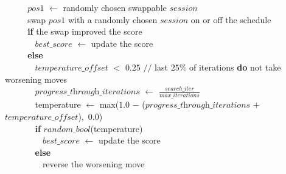 $~~~~~~~~~~~~$$\textit{pos1}$ $\leftarrow$ randomly chosen swappable $\textit{session}$\\
$~~~~~~~~~~~~$swap $\textit{pos1}$ with a randomly chosen $\textit{session}$ on or off the schedule\\
$~~~~~~~~~~~~${\bf if} the swap improved the score\\
$~~~~~~~~~~~~~~~~$$\textit{best\_score}$ $\leftarrow$ update the score\\
$~~~~~~~~~~~~${\bf else}\\
$~~~~~~~~~~~~~~~~$$\textit{temperature\_offset}$ $<$ $0.25$ $//$ last $25\%$ of iterations {\bf do} not take worsening moves\\
$~~~~~~~~~~~~~~~~$$\textit{progress\_through\_iterations}$ $\leftarrow$ $\frac{search\_iter}{max\_iterations}$\\
$~~~~~~~~~~~~~~~~$temperature $\leftarrow$ max($1.0$ $-$ ($\textit{progress\_through\_iterations}$ $+$ $\textit{temperature\_offset}$)$,$ $0.0$)\\
$~~~~~~~~~~~~~~~~${\bf if} $\textit{random\_bool}$(temperature)\\
$~~~~~~~~~~~~~~~~~~~~$$\textit{best\_score}$ $\leftarrow$ update the score\\
$~~~~~~~~~~~~~~~~${\bf else}\\
$~~~~~~~~~~~~~~~~~~~~$reverse the worsening move\\